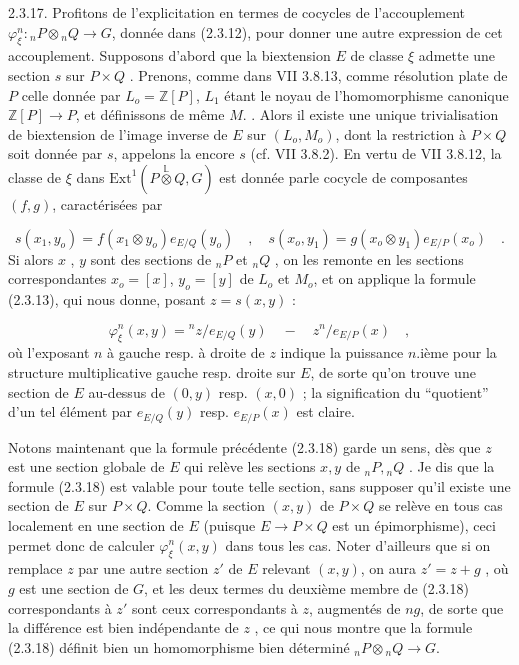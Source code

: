 2.3.17. \quad Profitons de l'explicitation en termes de cocycles de l'accouplement $\varphi_\xi^n : {}_nP \otimes {}_nQ \longrightarrow G$, donnée dans (2.3.12), pour donner une autre expression de cet accouplement. Supposons d'abord que la biextension $E$ de classe $\xi$ admette une section $s$ sur $P \times Q$ . Prenons, comme
dans VII 3.8.13, comme résolution plate de $P$ celle donnée par $L_o = \mathbb{Z}[P]$, $L_1$ étant le noyau de l'homomorphisme canonique $\mathbb{Z}[P] \longrightarrow P$, et définissons de même $M.$ . Alors il existe une unique trivialisation de biextension de l'image inverse de $E$ sur $(L_o,M_o)$, dont la restriction à $P \times Q$ soit donnée par $s$, appelons la encore $s$ (cf. VII 3.8.2). En vertu de VII 3.8.12, la classe de $\xi$ dans $\mathrm{Ext}^1(P \stackrel{\mathbb{L}}{\otimes} Q, G)$ est donnée parle cocycle de composantes $(f,g)$, caractérisées par

\begin{equation*}
s(x_1,y_o) = f(x_1 \otimes y_o) e_{E/Q}(y_o) \quad , \quad s(x_o,y_1) = g(x_o \otimes y_1) e_{E/P}(x_o) \quad .
\end{equation*}
Si alors $x$ , $y$ sont des sections de ${}_nP$ et ${}_nQ$ , on les remonte en les sections correspondantes $x_o = [x]$, $y_o = [y]$ de $L_o$ et $M_o$, et on applique la formule (2.3.13), qui nous donne, posant $z = s(x,y)$ :

\begin{equation}\tag{2.3.18}
\varphi_{\xi}^{n}(x,y) = {}^{n}z/e_{E/Q}(y) \quad - \quad z^{n}/e_{E/P}(x) \quad ,
\end{equation}
où l'exposant $n$ à gauche resp. à droite de $z$ indique la puissance $n$.ième pour la structure multiplicative gauche resp. droite sur $E$, de sorte qu'on trouve une section de $E$ au-dessus de $(0,y)$ resp. $(x,0)$ ; la signification du ``quotient'' d'un tel élément par $e_{E/Q}(y)$ resp. $e_{E/P}(x)$ est claire.

Notons maintenant que la formule précédente (2.3.18) garde un sens, dès que $z$ est une section globale de $E$ qui relève les sections $x,y$ de ${}_nP, {}_nQ$ . Je dis que la formule (2.3.18) est valable pour toute telle section, sans supposer qu'il existe une section de $E$ sur $P \times Q$. Comme la section $(x,y)$ de $P \times Q$ se relève en tous cas localement en une section de $E$ (puisque $E \longrightarrow P \times Q$ est un épimorphisme), ceci permet donc de calculer $\varphi_{\xi}^{n}(x,y)$ dans tous les cas. Noter d'ailleurs que si on
remplace $z$ par une autre section $z'$ de $E$ relevant $(x,y)$, on aura $z' = z + g$ , où $g$ est une section de $G$, et les deux termes du deuxième membre de (2.3.18) correspondants à $z'$ sont ceux correspondants à $z$, augmentés de $ng$, de sorte que la différence est bien indépendante de $z$ , ce qui nous montre que la formule (2.3.18) définit bien un homomorphisme bien déterminé ${}_nP \otimes {}_nQ \longrightarrow G$.

